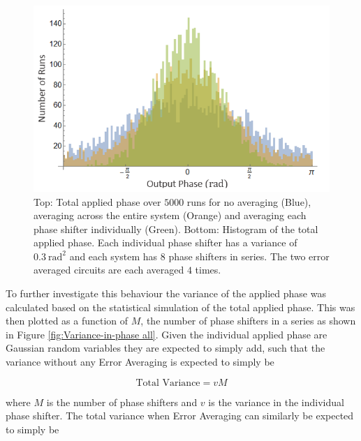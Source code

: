 \documentclass[aps,pra,twocolumn,superscriptaddress,numerical]{revtex4-1}
\begin{document}
		
		\begin{figure}
			\begin{centering}
				\includegraphics[width=\columnwidth]{totPhase2.png}
				\par\end{centering}
			
			\caption[Statistical simulation of total applied phase for no correction, correcting across the system and correcting each element individually for a smaller system. ]{Top: Total applied phase over $5000$ runs for no averaging (Blue), averaging across the entire system (Orange) and averaging each phase shifter individually (Green). Bottom: Histogram of the total applied phase. Each individual phase shifter has a variance of $0.3\ \textrm{rad}^{2}$ and each system has $8$ phase shifters in series. The two error averaged circuits are each averaged $4$ times. \label{fig:Total-applied-phase2}}
		\end{figure}
		
		
		To further investigate this behaviour the variance of the applied phase was calculated based on the statistical simulation of the total applied phase. This was then plotted as a function of $M$, the number of phase shifters in a series as shown in Figure \ref{fig:Variance-in-phase all}. Given the individual applied phase are Gaussian random variables they are expected to simply add, such that the variance without any Error Averaging is expected to simply be
		
		\begin{equation}
		\textrm{Total Variance}=vM\label{eq:Tot Var no correction}
		\end{equation}
		
		
		where $M$ is the number of phase shifters and $v$ is the variance in the individual phase shifter. The total variance when Error Averaging can similarly be expected to simply be
		
\end{document}
